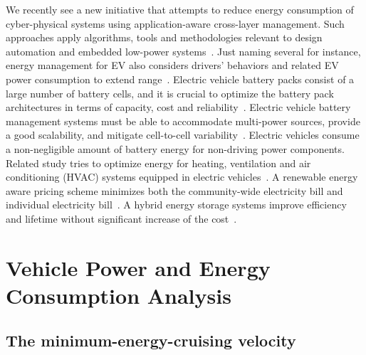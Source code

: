 \documentclass{IEEEtran}
\begin{document}
We recently see a new initiative that attempts to reduce energy consumption of cyber-physical systems using application-aware cross-layer management. Such approaches apply algorithms, tools and methodologies relevant to design automation and embedded low-power systems~\cite{Seshia:TCAD17}. 
Just naming several for instance, energy management for EV also considers drivers' behaviors and related EV power consumption to extend range~\cite{Vatanparvar:TSG18,Vatanparvar:TODAES17}.
Electric vehicle battery packs consist of a large number of battery cells, and it is crucial to optimize the battery pack architectures in terms of capacity, cost and reliability~\cite{Wu:TCAD13,Shaheer:RTCSA17}. 
Electric vehicle battery management systems must be able to accommodate multi-power sources, provide a good scalability, and mitigate cell-to-cell variability~\cite{Shin:TCAD15}.
Electric vehicles consume a non-negligible amount of battery energy for non-driving power components. Related study tries to optimize energy for heating, ventilation and air conditioning (HVAC) systems equipped in electric vehicles~\cite{Zhao:ICCAD15,Vatanparvar:TECS18}. 
A renewable energy aware pricing scheme minimizes both the community-wide electricity bill and individual electricity bill~\cite{Liu:TPDS17}.
A hybrid energy storage systems improve efficiency and lifetime without significant increase of the cost~\cite{Xie:TCAD13, Kim:JPS14}. 




\section{Vehicle Power and Energy Consumption Analysis} \label{sec:energy consumption}

\subsection{The minimum-energy-cruising velocity} \label{subsec:opt-cruising}
\end{document}
